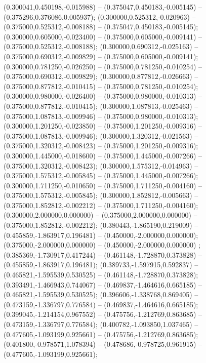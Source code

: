  (0.300041,0.450198,-0.015988) -- (0.375047,0.450183,-0.005145) -- (0.375296,0.376086,0.005937);
 (0.300000,0.525312,-0.020963) -- (0.375000,0.525312,-0.008188) -- (0.375047,0.450183,-0.005145);
 (0.300000,0.605000,-0.023400) -- (0.375000,0.605000,-0.009141) -- (0.375000,0.525312,-0.008188);
 (0.300000,0.690312,-0.025163) -- (0.375000,0.690312,-0.009829) -- (0.375000,0.605000,-0.009141);
 (0.300000,0.781250,-0.026250) -- (0.375000,0.781250,-0.010254) -- (0.375000,0.690312,-0.009829);
 (0.300000,0.877812,-0.026663) -- (0.375000,0.877812,-0.010415) -- (0.375000,0.781250,-0.010254);
 (0.300000,0.980000,-0.026400) -- (0.375000,0.980000,-0.010313) -- (0.375000,0.877812,-0.010415);
 (0.300000,1.087813,-0.025463) -- (0.375000,1.087813,-0.009946) -- (0.375000,0.980000,-0.010313);
 (0.300000,1.201250,-0.023850) -- (0.375000,1.201250,-0.009316) -- (0.375000,1.087813,-0.009946);
 (0.300000,1.320312,-0.021563) -- (0.375000,1.320312,-0.008423) -- (0.375000,1.201250,-0.009316);
 (0.300000,1.445000,-0.018600) -- (0.375000,1.445000,-0.007266) -- (0.375000,1.320312,-0.008423);
 (0.300000,1.575312,-0.014963) -- (0.375000,1.575312,-0.005845) -- (0.375000,1.445000,-0.007266);
 (0.300000,1.711250,-0.010650) -- (0.375000,1.711250,-0.004160) -- (0.375000,1.575312,-0.005845);
 (0.300000,1.852812,-0.005663) -- (0.375000,1.852812,-0.002212) -- (0.375000,1.711250,-0.004160);
 (0.300000,2.000000,0.000000) -- (0.375000,2.000000,0.000000) -- (0.375000,1.852812,-0.002212);
 (0.380443,-1.865190,0.219009) -- (0.455859,-1.863917,0.196481) -- (0.450000,-2.000000,0.000000);
 (0.375000,-2.000000,0.000000) -- (0.450000,-2.000000,0.000000) ;
 (0.385369,-1.730917,0.417244) -- (0.461148,-1.728870,0.373828) -- (0.455859,-1.863917,0.196481);
 (0.389733,-1.597915,0.592837) -- (0.465821,-1.595539,0.530525) -- (0.461148,-1.728870,0.373828);
 (0.393491,-1.466943,0.744067) -- (0.469837,-1.464616,0.665185) -- (0.465821,-1.595539,0.530525);
 (0.396606,-1.338768,0.869405) -- (0.473159,-1.336797,0.776584) -- (0.469837,-1.464616,0.665185);
 (0.399045,-1.214154,0.967552) -- (0.475756,-1.212769,0.863685) -- (0.473159,-1.336797,0.776584);
 (0.400782,-1.093850,1.037465) -- (0.477605,-1.093199,0.925661) -- (0.475756,-1.212769,0.863685);
 (0.401800,-0.978571,1.078394) -- (0.478686,-0.978725,0.961915) -- (0.477605,-1.093199,0.925661);
